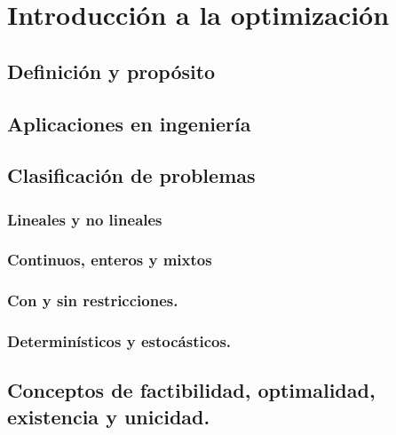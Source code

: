\section{Introducción a la optimización}

\subsection{Definición y propósito}
\subsection{Aplicaciones en ingeniería}
\subsection{Clasificación de problemas}
\subsubsection{Lineales y no lineales}
\subsubsection{Continuos, enteros y mixtos}
\subsubsection{Con y sin restricciones.}
\subsubsection{Determinísticos y estocásticos.}
\subsection{Conceptos de factibilidad, optimalidad, existencia y unicidad.}